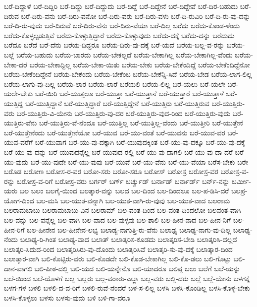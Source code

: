 {ಬರೆ-ದಿದ್ದಾಳೆ
ಬರೆ-ದಿದ್ದಿರಿ
ಬರೆ-ದಿದ್ದು
ಬರೆ-ದಿದ್ದುದು
ಬರೆ-ದಿದ್ದೆ
ಬರೆ-ದಿದ್ದೇನೆ
ಬರೆ-ದಿದ್ದೇವೆ
ಬರೆ-ದಿರ-ಬಹುದು
ಬರೆ-ದಿರುವ
ಬರೆ-ದಿರು-ವನು
ಬರೆ-ದಿರು-ವನೋ
ಬರೆ-ದಿರು-ವರು
ಬರೆ-ದಿರು-ವಳು
ಬರೆ-ದಿ-ರುವಿರಿ
ಬರೆ-ದಿ-ರು-ವು-ದನ್ನು
ಬರೆ-ದಿ-ರು-ವುದು
ಬರೆ-ದಿರುವೆ
ಬರೆ-ದಿರು-ವೆನು
ಬರೆ-ದಿರು-ವೆಯಾ
ಬರೆ-ದಿಲ್ಲ
ಬರೆದು
ಬರೆದು-ಕೊಂಡ-ಳೆಂದು
ಬರೆದು-ಕೊಳ್ಳಲ್ಪಡುತ್ತಿವೆ
ಬರೆದು-ಕೊಳ್ಳುತ್ತಿದ್ದಾರೆ
ಬರೆದು-ಕೊಳ್ಳುವುದು
ಬರೆದು-ದಕ್ಕೆ
ಬರೆದು-ದನ್ನು
ಬರೆದುದು
ಬರೆದೂ
ಬರೆದೆ
ಬರೆ-ದೆನು
ಬರೆಯ-ದಿದ್ದರೂ
ಬರೆಯ-ದಿರು-ವು-ದಕ್ಕೆ
ಬರೆ-ಯದೆ
ಬರೆಯ-ಬಲ್ಲ-ವ-ರನ್ನು
ಬರೆಯ-ಬಲ್ಲೆ
ಬರೆಯ-ಬಹುದು
ಬರೆಯ-ಬಾರದು
ಬರೆಯ-ಬೇಕಲ್ಲದೆ
ಬರೆಯ-ಬೇಕಾಗಿಲ್ಲ
ಬರೆಯ-ಬೇಕಾಗಿಲ್ಲ-ವೆಂದು
ಬರೆಯ-ಬೇಕಾ-ದರೆ
ಬರೆಯ-ಬೇಕಾದ್ದಿಲ್ಲ
ಬರೆಯ-ಬೇಕಾ-ಯಿತು
ಬರೆಯ-ಬೇಕು
ಬರೆಯ-ಬೇಕೆಂದಿದ್ದೆ
ಬರೆಯ-ಬೇಕೆಂದಿದ್ದೆನೋ
ಬರೆಯ-ಬೇಕೆಂದಿದ್ದೇನೆ
ಬರೆಯ-ಬೇಕೆಂದು
ಬರೆಯ-ಬೇಕೆಂಬ
ಬರೆಯ-ಬೇಕೆನ್ನಿ-ಸಿದೆ
ಬರೆಯ-ಬೇಡ
ಬರೆಯ-ಲಾಗ-ಲಿಲ್ಲ
ಬರೆಯ-ಲಾಗು-ವು-ದಿಲ್ಲ
ಬರೆಯ-ಲಾರ
ಬರೆಯ-ಲಾರೆ
ಬರೆಯಲಿ
ಬರೆಯ-ಲಿಲ್ಲ
ಬರೆ-ಯಲು
ಬರೆ-ಯಲೇ
ಬರೆ-ಯಲೇ-ಬೇಕು
ಬರೆ-ಯಿರಿ
ಬರೆ-ಯುತ್ತಲೂ
ಬರೆ-ಯುತ್ತಾ
ಬರೆ-ಯುತ್ತಾನೆ
ಬರೆ-ಯುತ್ತಾರೆ
ಬರೆ-ಯುತ್ತಾಳೆ
ಬರೆ-ಯುತ್ತಿದ್ದ
ಬರೆ-ಯುತ್ತಿದ್ದಾನೆ
ಬರೆ-ಯುತ್ತಿದ್ದಾರೆ
ಬರೆ-ಯುತ್ತಿದ್ದೇನೆ
ಬರೆ-ಯುತ್ತಿರು
ಬರೆ-ಯುತ್ತಿರುವ
ಬರೆ-ಯುತ್ತಿರು-ವರು
ಬರೆ-ಯುತ್ತಿರು-ವಿ-ಯೇನು
ಬರೆ-ಯುತ್ತಿರು-ವು-ದರ
ಬರೆ-ಯುತ್ತಿರು-ವುದ-ರಿಂದ
ಬರೆ-ಯುತ್ತಿರು-ವುದು
ಬರೆ-ಯುತ್ತಿರು-ವೆನು
ಬರೆ-ಯುತ್ತಿರು-ವೆ-ನೆಂದೂ
ಬರೆ-ಯುತ್ತಿಲ್ಲ
ಬರೆ-ಯುತ್ತಿಲ್ಲ-ವೆಂದು
ಬರೆ-ಯುತ್ತೀರಿ
ಬರೆ-ಯುತ್ತೇನೆ
ಬರೆ-ಯುತ್ತೇನೆಂದು
ಬರೆ-ಯುತ್ತೇನೆಯೋ
ಬರೆ-ಯುವ
ಬರೆ-ಯು-ವಂತೆ
ಬರೆ-ಯುವನು
ಬರೆ-ಯುವ-ವರ
ಬರೆ-ಯುವ-ವರೆಗೆ
ಬರೆ-ಯುವಾಗ
ಬರೆ-ಯು-ವು-ದಕ್ಕಾಗಿ
ಬರೆ-ಯುವುದಕ್ಕಿಂತ
ಬರೆ-ಯು-ವು-ದಕ್ಕೂ
ಬರೆ-ಯು-ವು-ದಕ್ಕೆ
ಬರೆ-ಯು-ವು-ದನ್ನು
ಬರೆ-ಯುವುದನ್ನೆಲ್ಲ
ಬರೆ-ಯುವುದ-ರಲ್ಲಿ
ಬರೆ-ಯು-ವು-ದಾಗಲಿ
ಬರೆ-ಯು-ವು-ದಾ-ದರೆ
ಬರೆ-ಯು-ವುದು
ಬರೆ-ಯು-ವುದೇ
ಬರೆ-ಯು-ವುವು
ಬರೆ-ಯುವೆ
ಬರೆ-ಯು-ವೆನು
ಬರೆ-ಯು-ವೆಯಾ
ಬರೆಸ-ಬೇಕು
ಬರೇ
ಬರೊಡ
ಬರೋಣ
ಬರೋಸ-ರ-ವರ
ಬರೋ-ಸರು
ಬರೋ-ಸರೂ
ಬರೋಸ್
ಬರೋಸ್ರ
ಬರೋಸ್ರ-ವರ
ಬರೋಸ್ರ-ವ-ರನ್ನು
ಬರೋಸ್ರ-ವ-ರಿಗೆ
ಬರೋಸ್ರ-ವರು
ಬರ್ಗರ್
ಬರ್ಗ್
ಬರ್ಚ್ವುಡ್
ಬರ್ನಾಡ್
ಬರ್ನಾರ್ಡ್
ಬರ್ನ್-ನನ್ನು
ಬರ್ಮೀ-ಯರು
ಬಲ
ಬಲಂ
ಬಲಗೈ-ಯಿಂದ
ಬಲತ್ಕಾರ-ವನ್ನು
ಬಲದ
ಬಲ-ದಿಂದ
ಬಲ-ದಿಂದಲೂ
ಬಲ-ಪ-ಡಿಸಿ-ದರೆ
ಬಲಪ್ರ-ಯೋಗ-ದಿಂದ
ಬಲ-ಮಸಿ
ಬಲ-ಯುತ-ವನ್ನಾಗಿ
ಬಲ-ಯುತ-ವಾಗಿ-ರು-ವುವು
ಬಲ-ಯುತ-ವಾದ
ಬಲರಾಮ
ಬಲರಾಮಬಾಬು
ಬಲರಾಮಬಾಬು-ವಿನ
ಬಲರಾಮ್
ಬಲ-ವಂತ-ದಿಂದ
ಬಲ-ವಂತ-ದಿಂದಲೋ
ಬಲವಂತ-ವಾಗಿ
ಬಲ-ವನ್ನು
ಬಲ-ವನ್ನೆಲ್ಲ
ಬಲ-ವಾಗಿ
ಬಲ-ವಾದ
ಬಲ-ವುಳ್ಳವು
ಬಲ-ಶಾಲಿ
ಬಲ-ಹೀನ-ನಾದ
ಬಲ-ಹೀನ-ನಿಗೆ
ಬಲ-ಹೀನ-ರಿಗೆ
ಬಲ-ಹೀನೇನ
ಬಲ-ಹೀನೇನ-ಲಭ್ಯ
ಬಲಾಡ್ಯ-ನಾಗುತ್ತಿ-ರು-ವೆನು
ಬಲಾಢ್ಯ
ಬಲಾಢ್ಯ-ನಾಗು-ವು-ದಿಲ್ಲ
ಬಲಾಢ್ಯ-ನೆಂದು
ಬಲಾಢ್ಯ-ರಿ-ಗಿಂತ
ಬಲಾಢ್ಯ-ವಾದ
ಬಲಾತ್
ಬಲಾತ್ಕರಿಸ-ಕೂಡದು
ಬಲಾತ್ಕರಿಸ-ಬೇಡಿ
ಬಲಾತ್ಕರಿಸಿ-ದಲ್ಲದೆ
ಬಲಾತ್ಕರಿ-ಸಿದುದ-ರಿಂದ
ಬಲಾತ್ಕರಿಸಿರು-ವು-ದೊಂದು
ಬಲಾತ್ಕರಿಸಿವೆ
ಬಲಾತ್ಕರಿ-ಸು-ವು-ದಕ್ಕೆ
ಬಲಾತ್ಕಾರ-ದಿಂದ
ಬಲಾತ್ಕಾರ-ವಾಗಿ
ಬಲಿ-ಕೊಟ್ಟಿರು-ವರು
ಬಲಿ-ಕೊಡದೇ
ಬಲಿ-ಕೊಡ-ಬೇಕಾಗಿಲ್ಲ
ಬಲಿ-ಕೊ-ಡಲು
ಬಲಿ-ಗೊಟ್ಟು
ಬಲಿ-ದಾನ-ವಾಗಲಿ
ಬಲಿ-ಪೀಠ-ದಲ್ಲಿ
ಬಲಿ-ಯದ
ಬಲಿ-ಯನ್ನೇನೊ
ಬಲಿ-ಯಾದರೂ
ಬಲಿಷ್ಠ
ಬಲು
ಬಲೆಗೆ
ಬಲೆ-ಯನ್ನು
ಬಲೆ-ಯಿಂದ
ಬಲೆ-ಯೊಳಗೆ
ಬಲ್ಲ
ಬಲ್ಲರು
ಬಲ್ಲ-ವರಾರು-ಎಲ್ಲಾ
ಬಲ್ಲ-ವರು
ಬಲ್ಲಿ-ದರು
ಬಲ್ಲೆ
ಬಲ್ಲೆ-ಯೇನು
ಬಳಗಕ್ಕೆ
ಬಳಗ-ಗಳ
ಬಳಲಿ
ಬಳಲಿ-ದ-ವ-ರಿಗೆ
ಬಳಲಿ-ರುವೆ-ನೆಂದರೆ
ಬಳ-ಸ-ಲಿಲ್ಲ
ಬಳಸಿ
ಬಳಸಿ-ಕೊಂಡಿಲ್ಲ
ಬಳಸಿ-ಕೊಳ್ಳ-ಬೇಕು
ಬಳಸಿ-ಕೊಳ್ಳಲು
ಬಳಸು
ಬಳಸು-ವುದು
ಬಳಿ
ಬಳಿ-ಗಾ-ದರೂ
}
